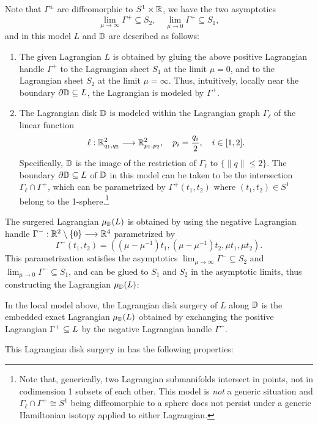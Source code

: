 \noindent Note that $\Gamma^\pm$ are diffeomorphic to $S^{1}\times\mathbb{R}$, we have the two asymptotics
$$\displaystyle\lim_{\mu\to\infty}\Gamma^+\subseteq S_2,\quad \displaystyle\lim_{\mu\to0}\Gamma^+\subseteq S_1,$$
and in this model $L$ and $\mathbb{D}$ are described as follows:

\begin{enumerate}
    \item The given Lagrangian $L$ is obtained by gluing the above positive Lagrangian handle $\Gamma^+$ to the Lagrangian sheet $S_1$ at the limit $\mu=0$, and to the Lagrangian sheet $S_2$ at the limit $\mu=\infty$. Thus, intuitively, locally near the boundary $\partial\mathbb{D}\subseteq L$, the Lagrangian is modeled by $\Gamma^+$.\\

    \item The Lagrangian disk $\mathbb{D}$ is modeled within the Lagrangian graph $\Gamma_\ell$ of the linear function
    $$\ell:\mathbb{R}^2_{q_1,q_2}\longrightarrow\mathbb{R}^2_{p_1,p_2},\quad p_i=\frac{q_i}{2},\quad i\in[1,2].$$
    Specifically, $\mathbb{D}$ is the image of the restriction of $\Gamma_\ell$ to $\{\|q\|\leq2\}$.
    The boundary $\partial\mathbb{D}\subseteq L$ of $\mathbb{D}$ in this model can be taken to be the intersection $\Gamma_\ell\cap\Gamma^+$, which can be parametrized by $\Gamma^+(t_1,t_2)$ where $(t_1,t_2)\in S^1$ belong to the 1-sphere.\footnote{Note that, generically, two Lagrangian submanifolds intersect in points, not in codimension 1 subsets of each other. This model is {\it not} a generic situation and $\Gamma_\ell\cap\Gamma^+\cong S^{1}$ being diffeomorphic to a sphere does not persist under a generic Hamiltonian isotopy applied to either Lagrangian.}
\end{enumerate}

\noindent The surgered Lagrangian $\mu_{\mathbb{D}}(L)$ is obtained by using the negative Lagrangian handle $\Gamma^-:\mathbb{R}^2\setminus\{0\}\longrightarrow\mathbb{R}^{4}$ parametrized by
$$\Gamma^-(t_1,t_{2})=\left((\mu-\mu^{-1})t_1,(\mu-\mu^{-1})t_{2},\mu t_1,\mu t_{2}\right).$$
This parametrization satisfies the asymptotics $\displaystyle\lim_{\mu\to\infty}\Gamma^-\subseteq S_2$ and $\displaystyle\lim_{\mu\to0}\Gamma^-\subseteq S_1$, and can be glued to $S_1$ and $S_2$ in the asymptotic limits, thus constructing the Lagrangian $\mu_{\mathbb{D}}(L)$:

\begin{fdef}\label{def:disk_surgery} In the local model above, the Lagrangian disk surgery of $L$ along $\mathbb{D}$ is the embedded exact Lagrangian $\mu_{\mathbb{D}}(L)$ obtained by exchanging the positive Lagrangian $\Gamma^+\subseteq L$ by the negative Lagrangian handle $\Gamma^-$.
\end{fdef}
\vspace{0.2cm}
\noindent This Lagrangian disk surgery in  has the following properties:\\

